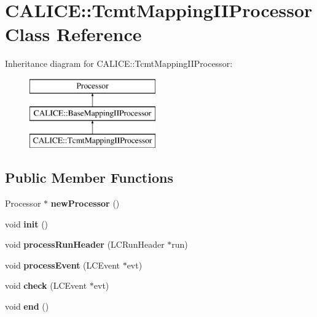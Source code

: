 \section{C\-A\-L\-I\-C\-E\-:\-:Tcmt\-Mapping\-I\-I\-Processor Class Reference}
\label{classCALICE_1_1TcmtMappingIIProcessor}
Inheritance diagram for C\-A\-L\-I\-C\-E\-:\-:Tcmt\-Mapping\-I\-I\-Processor\-:\begin{figure}[H]
\begin{center}
\leavevmode
\includegraphics[height=3.000000cm]{classCALICE_1_1TcmtMappingIIProcessor}
\end{center}
\end{figure}
\subsection*{Public Member Functions}
\begin{DoxyCompactItemize}
\item 
Processor $\ast$ {\bfseries new\-Processor} ()\label{classCALICE_1_1TcmtMappingIIProcessor_ac417015d21a1632426336568a495a2fa}

\item 
void {\bfseries init} ()\label{classCALICE_1_1TcmtMappingIIProcessor_ace486ac86291c644b789d0aa08594c5c}

\item 
void {\bfseries process\-Run\-Header} (L\-C\-Run\-Header $\ast$run)\label{classCALICE_1_1TcmtMappingIIProcessor_a1a174e14b6a40294339c428a7a03b58a}

\item 
void {\bfseries process\-Event} (L\-C\-Event $\ast$evt)\label{classCALICE_1_1TcmtMappingIIProcessor_ad6fb82cdf2edfcf25c94b1ffcc6a2fc6}

\item 
void {\bfseries check} (L\-C\-Event $\ast$evt)\label{classCALICE_1_1TcmtMappingIIProcessor_abc7540afa5e54c3f3908dfb9ef6691d7}

\item 
void {\bfseries end} ()\label{classCALICE_1_1TcmtMappingIIProcessor_aad749b67ac8b671bbb16bb52b49dd714}

\end{DoxyCompactItemize}
